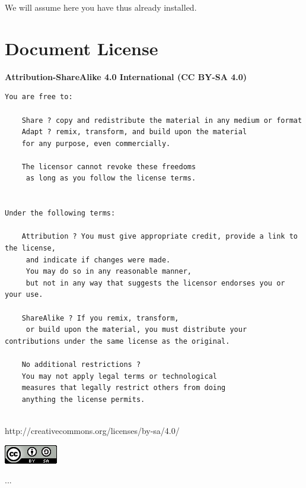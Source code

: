 \documentclass[12pt,a4paper]{book}
\begin{document}
We will assume here you have thus already installed.


\chapter{Document License}

\textbf{Attribution-ShareAlike 4.0 International (CC BY-SA 4.0)}

\begin{verbatim}
You are free to:

    Share ? copy and redistribute the material in any medium or format
    Adapt ? remix, transform, and build upon the material
    for any purpose, even commercially.

    The licensor cannot revoke these freedoms
     as long as you follow the license terms.


Under the following terms:

    Attribution ? You must give appropriate credit, provide a link to the license,
     and indicate if changes were made. 
     You may do so in any reasonable manner, 
     but not in any way that suggests the licensor endorses you or your use.

    ShareAlike ? If you remix, transform,
     or build upon the material, you must distribute your contributions under the same license as the original.

    No additional restrictions ? 
    You may not apply legal terms or technological 
    measures that legally restrict others from doing 
    anything the license permits.


\end{verbatim}

http://creativecommons.org/licenses/by-sa/4.0/


\includegraphics{cc-logi}
\newpage
\lipsum

...


\newpage

\indexspace
\indexname{}
\end{document}
